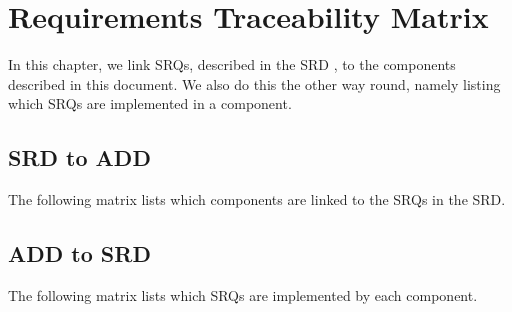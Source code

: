 \newcommand{\srdtoaddline}[2]{%
	\srqref{#1} & #2 \ifthenelse{\isodd{\thesrdtoaddcount}}{\\}{&}%
	\stepcounter{srdtoaddcount}
}
\newcommand{\srdtoaddendline}{%
	\ifthenelse{\isodd{\thesrdtoaddcount}}{& \\\stepcounter{srdtoaddcount}}{}
}
\makeatletter
\newcommand\addtosrdlist[1]{%
  \def\tempa{}%
  \@for\reserved:=#1\do{%
    \ifx\tempa\empty\else, \fi\srqref{\reserved}%
    \edef\tempa{something}%
  }
}
\makeatother

\let\oldRTMCUAP\RTMCUAP{}
\renewcommand{\RTMCUAP}{Client.UpdateApplication-Persistence}

\chapter{Requirements Traceability Matrix}
\label{chap:reqtracematrix}
In this chapter, we link SRQs, described in the SRD \cite{srd}, to the components described in this document. We also do this the other way round, namely listing which SRQs are implemented in a component.

\section{SRD to ADD}
The following matrix lists which components are linked to the SRQs in the SRD.

\let\RTMCUAP\oldRTMCUAP

\section{ADD to SRD}
The following matrix lists which SRQs are implemented by each component.

